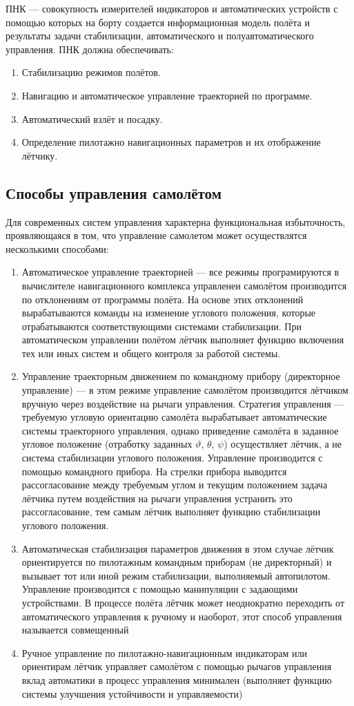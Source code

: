 \documentclass{article}
\begin{document}
ПНК --- совокупность измерителей индикаторов и автоматических устройств с помощью которых на борту создается информационная модель полёта и результаты задачи стабилизации, автоматического и полуавтоматического управления. ПНК должна обеспечивать: 
\begin{enumerate}
\item Стабилизацию режимов полётов.
\item Навигацию и автоматическое управление траекторией по программе.
\item Автоматический взлёт и посадку.
\item Определение пилотажно навигационных параметров и их отображение лётчику.
\end{enumerate}
\subsection{Способы управления самолётом}
Для современных систем управления характерна функциональная избыточность, проявляющаяся в том, что управление самолетом может осуществлятся несколькими способами: 
\begin{enumerate}
\item Автоматическое управление траекторией --- все режимы програмируются в вычислителе навигационного комплекса управленеи самолётом производится по отклонениям от программы полёта. На основе этих отклонений вырабатываются команды на изменение углового положения, которые отрабатываются соответствующими системами стабилизации. При автоматическом управлении полётом лётчик выполняет функцию включения тех или иных систем и общего контроля за работой системы. 
\item Управление траекторным движением по командному прибору (директорное управление) --- в этом режиме управление самолётом производится лётчиком вручную через воздействие на рычаги управления. Стратегия управления --- требуемую угловую ориентацию самолёта вырабатывает автоматические системы траекторного управления, однако приведение самолёта в заданное угловое положение (отработку заданных $\vartheta$, $\theta$, $\psi$) осуществляет лётчик, а не система стабилизации углового положения. Управление производится с помощью командного прибора. На стрелки прибора выводится рассогласование между требуемым углом и текущим положением задача лётчика путем воздействия на рычаги управления устранить это рассогласование, тем самым лётчик выполняет функцию стабилизации углового положения.
\item Автоматическая стабилизация параметров движения в этом случае лётчик ориентируется по пилотажным командным приборам (не директорный) и вызывает тот или иной режим стабилизации, выполняемый автопилотом. Управление производится с помощью манипуляции с задающими устройствами. В процессе полёта лётчик может неоднократно переходить от автоматического управления к ручному и наоборот, этот способ управления называется совмещенный
\item Ручное управление по пилотажно-навигационным индикаторам или ориентирам лётчик управляет самолётом с помощью рычагов управления вклад автоматики в процесс управления минимален (выполняет функцию системы улучшения устойчивости и управляемости)
\end{enumerate}
\end{document}
